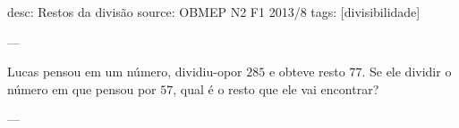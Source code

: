 desc:  Restos da divisão
source:  OBMEP N2 F1 2013/8
tags:  [divisibilidade]

---

Lucas pensou em um número, dividiu-opor $285$ e obteve resto $77$. Se ele dividir o número em que pensou por $57$, qual é o resto que ele vai encontrar?

---
